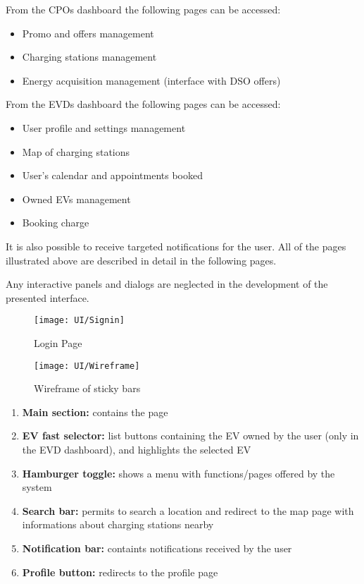 From the CPOs dashboard the following pages can be accessed:

\begin{itemize}
	\item Promo and offers management
	\item Charging stations management
	\item Energy acquisition management (interface with DSO offers)
\end{itemize}

From the EVDs dashboard the following pages can be accessed:

\begin{itemize}
	\item User profile and settings management
	\item Map of charging stations
	\item User’s calendar and appointments booked
	\item Owned EVs management
	\item Booking charge
\end{itemize}

It is also possible to receive targeted notifications for the user. All of the pages illustrated above are described in detail in the following pages.

Any interactive panels and dialogs are neglected in the development of the presented interface.

\begin{figure} [H]
	\begin{center}
		\texttt{[image: UI/Signin]}
		\caption{Login Page}
		\label{fig: cd}
	\end{center}
\end{figure}

\begin{figure} [H]
	\begin{center}
		\texttt{[image: UI/Wireframe]}
		\caption{Wireframe of sticky bars}
		\label{fig: cd}
	\end{center}
\end{figure}

\begin{enumerate}
	\item \textbf{Main section:} contains the page
	\item \textbf{EV fast selector:} list buttons containing the EV owned by the user (only in the EVD dashboard), and highlights the selected EV
	\item \textbf{Hamburger toggle:} shows a menu with functions/pages offered by the system
	\item \textbf{Search bar:} permits to search a location and redirect to the map page with informations about charging stations nearby
	\item \textbf{Notification bar:} containts notifications received by the user
	\item \textbf{Profile button:} redirects to the profile page
\end{enumerate}


